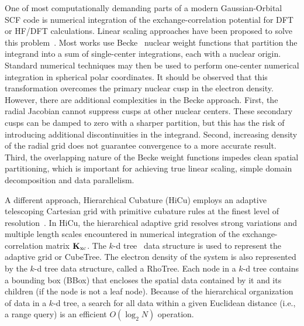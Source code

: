 \commentoutA{\documentclass[prl,aps,twocolumn,showpacs,twocolumngrid,superbib]{revtex4}}
\newcommand{\Kxc}{{\bf K}_{\mathrm{xc}}}
\begin{document}
One of most computationally demanding parts of a modern
Gaussian-Orbital SCF code is numerical integration of the
exchange-correlation potential for DFT or HF/DFT calculations. Linear
scaling approaches have been proposed to solve this 
problem~\cite{Jorda95,RStratmann96,CGuerra98,MChallacombe00A}.  Most
works use Becke~\cite{Becke88} nuclear weight functions that
partition the integrand into a sum of single-center integrations, each
with a nuclear origin.  Standard numerical techniques may then be
used to perform one-center numerical integration in spherical polar
coordinates.  It should be observed that this transformation 
overcomes the primary nuclear cusp in the electron density.  However, there 
are additional complexities in the Becke approach.  First, the radial Jacobian cannot 
suppress cusps at other nuclear centers.  These secondary cusps can 
be damped to zero with a sharper partition, but this has the risk of   
introducing additional discontinuities in the integrand.  Second, increasing 
density of the radial grid does not guarantee convergence to a 
more accurate result.  Third, the overlapping nature of the Becke weight functions 
impedes clean spatial partitioning, which is important for achieving true 
linear scaling, simple domain decomposition and data parallelism.

A different approach, Hierarchical Cubature (HiCu) employs an adaptive
telescoping Cartesian grid with primitive cubature rules at the finest
level of resolution~\cite{MChallacombe00A}.  In HiCu, the hierarchical
adaptive grid resolves strong variations and multiple length scales
encountered in numerical integration of the exchange-correlation
matrix $\Kxc$.  The $k$-d tree~\cite{Bentley79,Bentley80,Gaede98} data
structure is used to represent the adaptive grid or CubeTree. The
electron density of the system is also represented by the $k$-d tree
data structure, called a RhoTree.  Each node in a $k$-d tree contains
a bounding box (BBox) that encloses the spatial data contained by it
and its children (if the node is not a leaf node).  Because of the
hierarchical organization of data in a $k$-d tree, a search for all
data within a given Euclidean distance (i.e., a range query) is an
efficient $O(\log_{2}N)$ operation.
\end{document}
